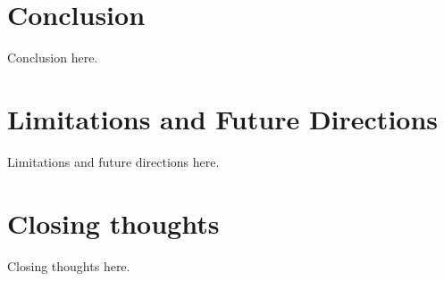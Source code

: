 \begin{dissertationepilogue}

    \setcounter{chapter}{4}
    \setcounter{section}{0}

    \section{Conclusion}

    Conclusion here.

    \section{Limitations and Future Directions}

    Limitations and future directions here.

    \section{Closing thoughts}

    Closing thoughts here.

\end{dissertationepilogue}